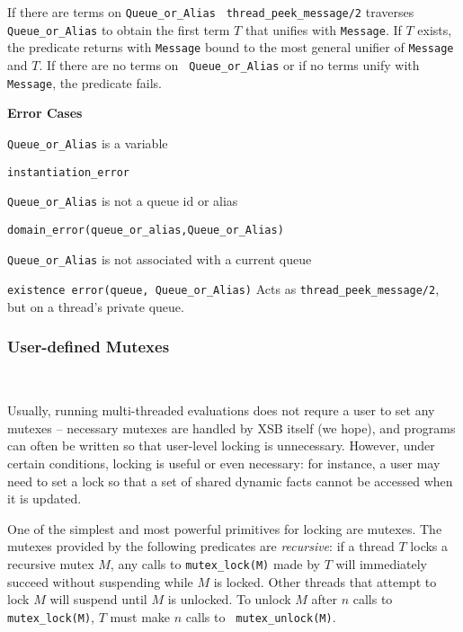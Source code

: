 \begin{description}
%
If there are terms on {\tt Queue\_or\_Alias} {\tt
  thread\_peek\_message/2} traverses {\tt Queue\_or\_Alias} to obtain
the first term $T$ that unifies with {\tt Message}.  If $T$ exists,
the predicate returns with {\tt Message} bound to the most general
unifier of {\tt Message} and $T$.  If there are no terms on {\tt
  Queue\_or\_Alias} or if no terms unify with {\tt Message}, the predicate fails.

{\bf Error Cases}
\bi
\item 	{\tt Queue\_or\_Alias} is a variable
\bi
\item 	{\tt instantiation\_error}
\ei
%
\item 	{\tt Queue\_or\_Alias} is not a queue id or alias
\bi
\item 	{\tt domain\_error(queue\_or\_alias,Queue\_or\_Alias)}
\ei
\item {\tt Queue\_or\_Alias} is not associated with a current queue
\bi
\item   {\tt existence error(queue, Queue\_or\_Alias)}
\ei
\ei
%
%
Acts as {\tt thread\_peek\_message/2}, but on a thread's private queue.

\end{description}

\subsubsection{User-defined Mutexes}~\label{sec:mutexes}
%

Usually, running multi-threaded evaluations does not requre a user to
set any mutexes -- necessary mutexes are handled by XSB itself (we
hope), and programs can often be written so that user-level locking is
unnecessary.  However, under certain conditions, locking is useful or
even necessary: for instance, a user may need to set a lock so that a
set of shared dynamic facts cannot be accessed when it is updated.

One of the simplest and most powerful primitives for locking are
mutexes.  The mutexes provided by the following predicates are {\em
  recursive}: if a thread $T$ locks a recursive mutex $M$, any calls
to {\tt mutex\_lock(M)} made by $T$ will immediately succeed without
suspending while $M$ is locked.  Other threads that attempt to lock
$M$ will suspend until $M$ is unlocked.  To unlock $M$ after $n$ calls
to {\tt mutex\_lock(M)}, $T$ must make $n$ calls to {\tt
  mutex\_unlock(M)}.

